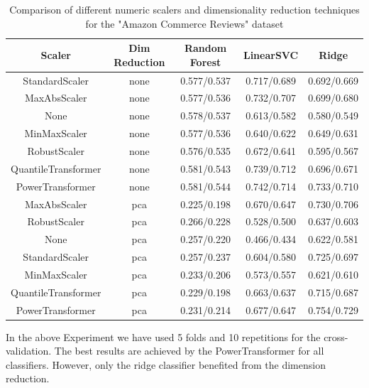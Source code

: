 \documentclass[a4paper,10pt]{article}
\begin{document}
\begin{table}[h!]
\centering
\small
\begin{tabular}{|c|c|c|c|c|}
\hline
\textbf{Scaler} & \textbf{Dim Reduction} & \textbf{Random Forest} & \textbf{LinearSVC} & \textbf{Ridge} \\
\hline
StandardScaler & none & 0.577/0.537 & 0.717/0.689 & 0.692/0.669 \\
\hline
MaxAbsScaler & none & 0.577/0.536 & 0.732/0.707 & 0.699/0.680 \\
\hline
None & none & 0.578/0.537 & 0.613/0.582 & 0.580/0.549 \\
\hline
MinMaxScaler & none & 0.577/0.536 & 0.640/0.622 & 0.649/0.631 \\
\hline
RobustScaler & none & 0.576/0.535 & 0.672/0.641 & 0.595/0.567 \\
\hline
QuantileTransformer & none &  0.581/0.543 & 0.739/0.712 & 0.696/0.671 \\
\hline
PowerTransformer & none &   \cellcolor[HTML]{C1E1C1} 0.581/0.544 & \cellcolor[HTML]{C1E1C1}  0.742/0.714 & 0.733/0.710 \\
\hline
MaxAbsScaler & pca & 0.225/0.198 & 0.670/0.647 & 0.730/0.706 \\
\hline
RobustScaler & pca & 0.266/0.228 & 0.528/0.500 & 0.637/0.603 \\
\hline
None & pca & 0.257/0.220 & 0.466/0.434 & 0.622/0.581 \\
\hline
StandardScaler & pca & 0.257/0.237 & 0.604/0.580 & 0.725/0.697 \\
\hline
MinMaxScaler & pca & 0.233/0.206 & 0.573/0.557 & 0.621/0.610 \\
\hline
QuantileTransformer & pca & 0.229/0.198 & 0.663/0.637 & 0.715/0.687 \\
\hline
PowerTransformer & pca & 0.231/0.214 & 0.677/0.647 & \cellcolor[HTML]{C1E1C1}  0.754/0.729 \\
\hline
\end{tabular}
\caption{Comparison of different numeric scalers and dimensionality reduction techniques for the "Amazon Commerce Reviews" dataset}
\label{table:scaling}
\end{table}







In the above Experiment we have used 5 folds and 10 repetitions for the cross-validation. The best results are achieved by the PowerTransformer for all classifiers. However, only the ridge classifier benefited from the
dimension reduction.
\end{document}
